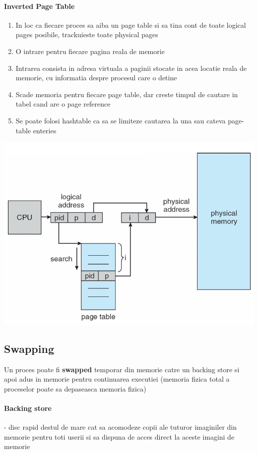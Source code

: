 \documentclass{article}
\begin{document}
\paragraph*{Inverted Page Table}
\begin{enumerate}
    \item In loc ca fiecare proces sa aiba un page table si sa tina cont de toate logical pages posibile, trackuieste toate physical pages
    \item O intrare pentru fiecare pagina reala de memorie
    \item Intrarea consista in adresa virtuala a paginii stocate in acea locatie reala de memorie, cu informatia despre procesul care o detine
    \item Scade memoria pentru fiecare page table, dar creste timpul de cautare in tabel cand are o page reference
    \item Se poate folosi hashtable ca sa se limiteze cautarea la una sau cateva page-table enteries
\end{enumerate}
\begin{center}
    \includegraphics[scale=0.3]{26-ipt.png}
\end{center}

\subsection*{Swapping}
Un proces poate fi \textbf{swapped} temporar din memorie catre un backing store si apoi adus in memorie pentru continuarea executiei (memoria fizica total a proceselor poate sa depaseasca memoria fizica)
\paragraph*{Backing store} - disc rapid destul de mare cat sa acomodeze copii ale tuturor imaginiler din memorie pentru toti userii si sa dispuna de acces direct la aceste imagini de memorie
\end{document}
